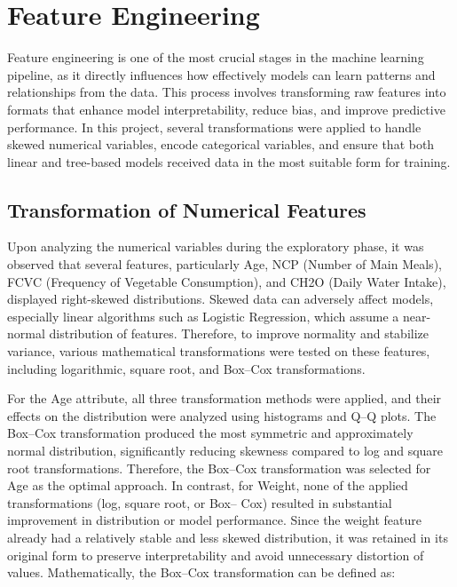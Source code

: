 \chapter{Feature Engineering}\label{ch:feature-engineering}


Feature engineering is one of the most crucial stages in the machine learning pipeline, as it directly influences how effectively models can learn patterns and relationships from the data.
This process involves transforming raw features into formats that enhance model interpretability, reduce bias, and improve predictive performance.
In this project, several transformations were applied to handle skewed numerical variables, encode categorical variables, and ensure that both linear and tree-based models received data in the most suitable form for training.



\section{Transformation of Numerical Features}\label{sec:transformation-of-numerical-features}

Upon analyzing the numerical variables during the exploratory phase, it was observed that several features, particularly Age, NCP (Number of Main Meals), FCVC (Frequency of Vegetable Consumption), and CH2O (Daily Water Intake), displayed right-skewed distributions.
Skewed data can adversely affect models, especially linear algorithms such as Logistic Regression, which assume a near-normal distribution of features.
Therefore, to improve normality and stabilize variance, various mathematical transformations were tested on these features, including logarithmic, square root, and Box–Cox transformations.

For the Age attribute, all three transformation methods were applied, and their effects on the distribution were analyzed using histograms and Q–Q plots.
The Box–Cox transformation produced the most symmetric and approximately normal distribution, significantly reducing skewness compared to log and square root transformations.
Therefore, the Box–Cox transformation was selected for Age as the optimal approach.
In contrast, for Weight, none of the applied transformations (log, square root, or Box– Cox) resulted in substantial improvement in distribution or model performance.
Since the weight feature already had a relatively stable and less skewed distribution, it was retained in its original form to preserve interpretability and avoid unnecessary distortion of values.
Mathematically, the Box–Cox transformation can be defined as:

